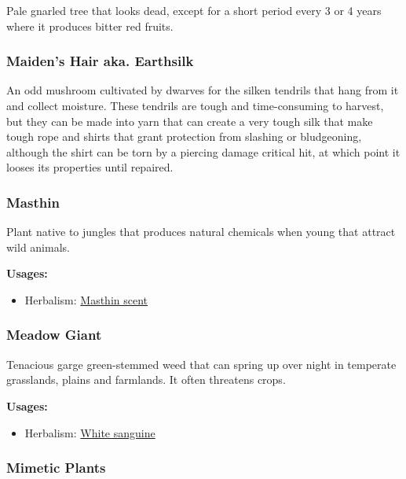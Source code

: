 Pale gnarled tree that looks dead, except for a short period every 3 or 4 years where it produces bitter red fruits.

\subsubsection{Maiden's Hair aka. Earthsilk}

An odd mushroom cultivated by dwarves for the silken tendrils that hang from it and collect moisture. These tendrils are tough and time-consuming to harvest, but they can be made into yarn that can create a very tough silk that make tough rope and shirts that grant protection from slashing or bludgeoning, although the shirt can be torn by a piercing damage critical hit, at which point it looses its properties until repaired.

\subsubsection{Masthin}
\label{Masthin}

Plant native to jungles that produces natural chemicals when young that attract wild animals.

\vspace{5mm}

\textbf{Usages:}

\begin{itemize}[noitemsep]
\item[] Herbalism: \hyperref[Masthin scent]{Masthin scent}
\end{itemize}

\subsubsection{Meadow Giant}
\label{Meadow Giant}

Tenacious garge green-stemmed weed that can spring up over night in temperate grasslands, plains and farmlands. It often threatens crops.

\vspace{5mm}

\textbf{Usages:}

\begin{itemize}[noitemsep]
\item[] Herbalism: \hyperref[White sanguine]{White sanguine}
\end{itemize}

\subsubsection{Mimetic Plants}

